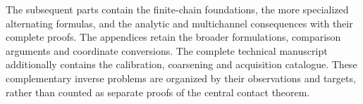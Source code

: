 The subsequent parts contain the finite-chain foundations, the more
specialized alternating formulas, and the analytic and multichannel
consequences with their complete proofs.  The appendices retain the
broader formulations, comparison arguments and coordinate conversions.
The complete technical manuscript additionally contains the calibration,
coarsening and acquisition catalogue.  These complementary inverse
problems are organized by their observations and targets, rather than
counted as separate proofs of the central contact theorem.
